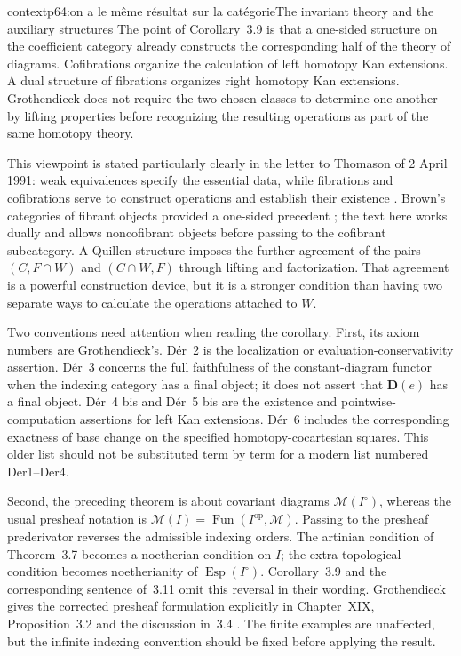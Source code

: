 \begin{dcomment}{context}{p64:on a le même résultat sur la catégorie}{The invariant theory and the auxiliary structures}
The point of Corollary~3.9 is that a one-sided structure on the coefficient category already constructs the corresponding half of the theory of diagrams. Cofibrations organize the calculation of left homotopy Kan extensions. A dual structure of fibrations organizes right homotopy Kan extensions. Grothendieck does not require the two chosen classes to determine one another by lifting properties before recognizing the resulting operations as part of the same homotopy theory.

This viewpoint is stated particularly clearly in the letter to Thomason of 2 April 1991: weak equivalences specify the essential data, while fibrations and cofibrations serve to construct operations and establish their existence \citep[point~1, printed pp.~3--4]{Grothendieck1991Letter}. Brown's categories of fibrant objects provided a one-sided precedent \citep[Section~1]{Brown1973}; the text here works dually and allows noncofibrant objects before passing to the cofibrant subcategory. A Quillen structure imposes the further agreement of the pairs $(C,F\cap W)$ and $(C\cap W,F)$ through lifting and factorization. That agreement is a powerful construction device, but it is a stronger condition than having two separate ways to calculate the operations attached to $W$.

Two conventions need attention when reading the corollary. First, its axiom numbers are Grothendieck's. Dér~2 is the localization or evaluation-conservativity assertion. Dér~3 concerns the full faithfulness of the constant-diagram functor when the indexing category has a final object; it does not assert that $\mathbf D(e)$ has a final object. Dér~4 bis and Dér~5 bis are the existence and pointwise-computation assertions for left Kan extensions. Dér~6 includes the corresponding exactness of base change on the specified homotopy-cocartesian squares. This older list should not be substituted term by term for a modern list numbered Der1--Der4.

Second, the preceding theorem is about covariant diagrams $\mathcal M(I^\circ)$, whereas the usual presheaf notation is $\mathcal M(I)=\operatorname{Fun}(I^{\mathrm{op}},\mathcal M)$. Passing to the presheaf prederivator reverses the admissible indexing orders. The artinian condition of Theorem~3.7 becomes a noetherian condition on $I$; the extra topological condition becomes noetherianity of $\operatorname{Esp}(I^\circ)$. Corollary~3.9 and the corresponding sentence of~3.11 omit this reversal in their wording. Grothendieck gives the corrected presheaf formulation explicitly in Chapter~XIX, Proposition~3.2 and the discussion in~3.4 \citep{Grothendieck1990XIX}. The finite examples are unaffected, but the infinite indexing convention should be fixed before applying the result.


\end{dcomment}
